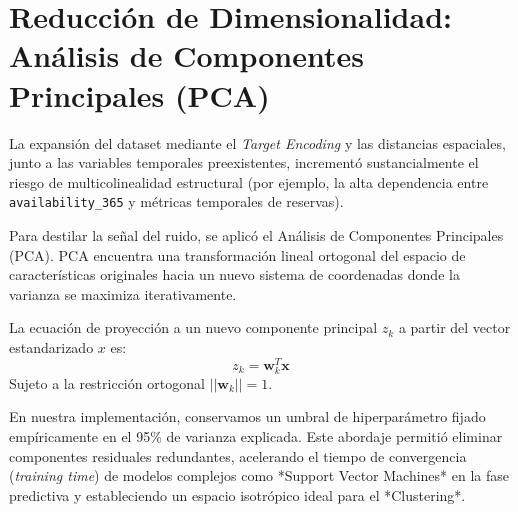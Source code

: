 \section{Reducción de Dimensionalidad: Análisis de Componentes Principales (PCA)}
La expansión del dataset mediante el \textit{Target Encoding} y las distancias espaciales, junto a las variables temporales preexistentes, incrementó sustancialmente el riesgo de multicolinealidad estructural (por ejemplo, la alta dependencia entre \texttt{availability\_365} y métricas temporales de reservas).

Para destilar la señal del ruido, se aplicó el Análisis de Componentes Principales (PCA). PCA encuentra una transformación lineal ortogonal del espacio de características originales hacia un nuevo sistema de coordenadas donde la varianza se maximiza iterativamente.

La ecuación de proyección a un nuevo componente principal $z_k$ a partir del vector estandarizado $x$ es:
\begin{equation}
z_k = \mathbf{w}_k^T \mathbf{x}
\end{equation}
Sujeto a la restricción ortogonal $||\mathbf{w}_k|| = 1$.

En nuestra implementación, conservamos un umbral de hiperparámetro fijado empíricamente en el 95\% de varianza explicada. Este abordaje permitió eliminar componentes residuales redundantes, acelerando el tiempo de convergencia (\textit{training time}) de modelos complejos como *Support Vector Machines* en la fase predictiva y estableciendo un espacio isotrópico ideal para el *Clustering*.
